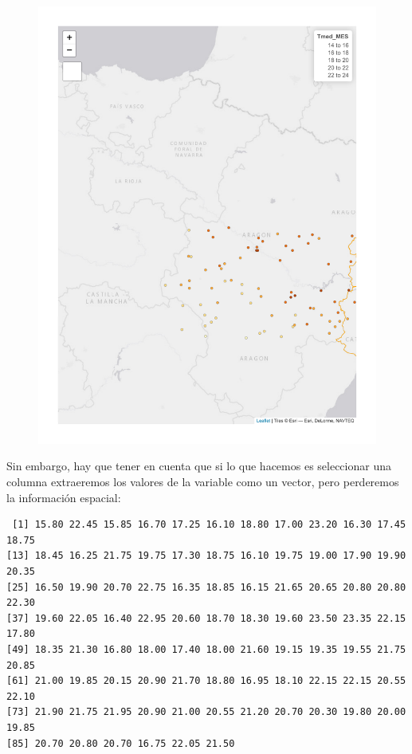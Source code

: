 \documentclass[
  letterpaper,
  DIV=11,
  numbers=noendperiod]{scrreprt}
\newenvironment{Shaded}{\begin{snugshade}}{\end{snugshade}}
\newcommand{\NormalTok}[1]{\textcolor[rgb]{0.00,0.23,0.31}{#1}}
\newcommand{\SpecialCharTok}[1]{\textcolor[rgb]{0.37,0.37,0.37}{#1}}
\begin{document}
\begin{figure}[H]

{\centering \includegraphics{03_DatosEspaciales_files/figure-pdf/unnamed-chunk-21-1.pdf}

}

\end{figure}

Sin embargo, hay que tener en cuenta que si lo que hacemos es
seleccionar una columna extraeremos los valores de la variable como un
vector, pero perderemos la información espacial:

\begin{Shaded}
\end{Shaded}

\begin{verbatim}
 [1] 15.80 22.45 15.85 16.70 17.25 16.10 18.80 17.00 23.20 16.30 17.45 18.75
[13] 18.45 16.25 21.75 19.75 17.30 18.75 16.10 19.75 19.00 17.90 19.90 20.35
[25] 16.50 19.90 20.70 22.75 16.35 18.85 16.15 21.65 20.65 20.80 20.80 22.30
[37] 19.60 22.05 16.40 22.95 20.60 18.70 18.30 19.60 23.50 23.35 22.15 17.80
[49] 18.35 21.30 16.80 18.00 17.40 18.00 21.60 19.15 19.35 19.55 21.75 20.85
[61] 21.00 19.85 20.15 20.90 21.70 18.80 16.95 18.10 22.15 22.15 20.55 22.10
[73] 21.90 21.75 21.95 20.90 21.00 20.55 21.20 20.70 20.30 19.80 20.00 19.85
[85] 20.70 20.80 20.70 16.75 22.05 21.50
\end{verbatim}
\end{document}
